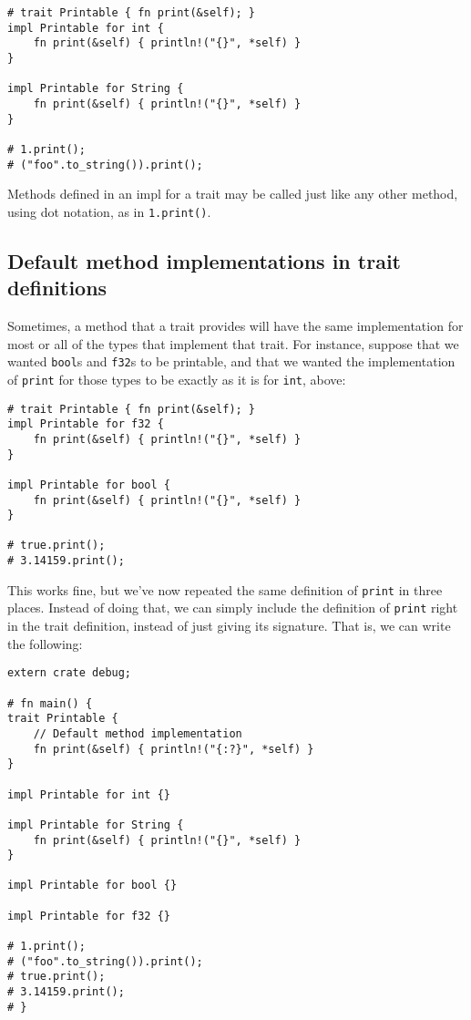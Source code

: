 \documentclass[]{article}
\begin{document}
\begin{verbatim}
# trait Printable { fn print(&self); }
impl Printable for int {
    fn print(&self) { println!("{}", *self) }
}

impl Printable for String {
    fn print(&self) { println!("{}", *self) }
}

# 1.print();
# ("foo".to_string()).print();
\end{verbatim}

Methods defined in an impl for a trait may be called just like any other
method, using dot notation, as in \texttt{1.print()}.

\subsection{Default method implementations in trait
definitions}\label{default-method-implementations-in-trait-definitions}

Sometimes, a method that a trait provides will have the same
implementation for most or all of the types that implement that trait.
For instance, suppose that we wanted \texttt{bool}s and \texttt{f32}s to
be printable, and that we wanted the implementation of \texttt{print}
for those types to be exactly as it is for \texttt{int}, above:

\begin{verbatim}
# trait Printable { fn print(&self); }
impl Printable for f32 {
    fn print(&self) { println!("{}", *self) }
}

impl Printable for bool {
    fn print(&self) { println!("{}", *self) }
}

# true.print();
# 3.14159.print();
\end{verbatim}

This works fine, but we've now repeated the same definition of
\texttt{print} in three places. Instead of doing that, we can simply
include the definition of \texttt{print} right in the trait definition,
instead of just giving its signature. That is, we can write the
following:

\begin{verbatim}
extern crate debug;

# fn main() {
trait Printable {
    // Default method implementation
    fn print(&self) { println!("{:?}", *self) }
}

impl Printable for int {}

impl Printable for String {
    fn print(&self) { println!("{}", *self) }
}

impl Printable for bool {}

impl Printable for f32 {}

# 1.print();
# ("foo".to_string()).print();
# true.print();
# 3.14159.print();
# }
\end{verbatim}
\end{document}

